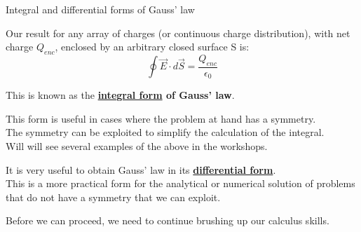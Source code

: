 %
%
%

\begin{frame}{Integral and differential forms of Gauss' law}

Our result for any array of charges (or continuous charge distribution), with net charge $Q_{enc}$,
enclosed by an arbitrary closed surface S is:
\begin{equation*}
  \oint \vec{E} \cdot d\vec{S} = \frac{Q_{enc}}{\epsilon_0}
\end{equation*}

This is known as the {\bf \underline{integral form} of Gauss' law}.\\
\vspace{0.2cm}

This form is useful in cases where the problem at hand has a symmetry.\\
The symmetry can be exploited to simplify the calculation of the integral.\\
Will will see several examples of the above in the workshops.\\
\vspace{0.2cm}

It is very useful to obtain Gauss' law in its {\bf \underline{differential form}}.\\
This is a more practical form for the analytical or numerical solution of problems
that do not have a symmetry that we can exploit.\\
\vspace{0.2cm}

Before we can proceed, we need to continue brushing up our calculus skills.

\end{frame}



